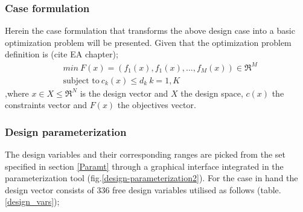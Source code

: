 \subsubsection{Case formulation}
Herein the case formulation that transforms the above design case into a basic optimization problem will be presented. Given that the optimization problem definition is (cite EA chapter);
\begin{align} 
   &min ~ F(x)=(f_1(x),f_1(x),...,f_M(x))\in \Re^{M} \nonumber \\
   &\mbox{subject to} ~ c_k(x)\leq d_k ~ k =1,K
\label{Optim}
\end{align}
,where $x\in X \!\leq\! \Re^{N}$ is the design vector and $X$ the design space, $c(x)$ the constraints vector and $F(x)$ the objectives vector.

\subsubsection{Design parameterization}
The design variables and their corresponding ranges are picked from the set specified in section \ref{Paramt} through a graphical interface integrated in the parameterization tool (fig.\ref{design-parameterization2}).  For the case in hand the design vector consists of $336$ free design variables utilised as follows (table. \ref{design_vars});
